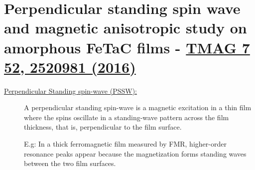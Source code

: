 \section{Perpendicular standing spin wave and magnetic anisotropic study on amorphous FeTaC films - \href{https://doi.org/10.1109/TMAG.2016.2520981}{TMAG 7 52, 2520981 (2016)}}

\begin{description}
    \item[\underline{Perpendicular Standing spin-wave (PSSW):}]A perpendicular standing spin-wave is a magnetic excitation in a thin film where the spins oscillate in a standing-wave pattern across the film thickness, that is, perpendicular to the film surface.

    E.g: In a thick ferromagnetic film measured by FMR, higher-order resonance peaks appear because the magnetization forms standing waves between the two film surfaces.
\end{description}
